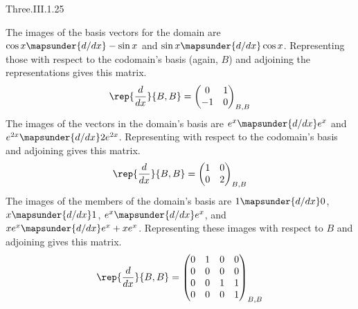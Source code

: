 \begin{ans}{Three.III.1.25}
      \begin{exparts}
        \partsitem The images of the basis vectors for the domain are
         \( \cos x\mapsunder{d/dx}-\sin x \) and
          \( \sin x\mapsunder{d/dx}\cos x \).
          Representing those with respect to the codomain's basis (again, $B$)
          and adjoining the representations gives this matrix.
          \begin{equation*}
            \rep{\frac{d}{dx}}{B,B}=
            \begin{pmatrix}
                0  &1  \\
               -1  &0
            \end{pmatrix}_{B,B}
          \end{equation*}
        \partsitem The images of the vectors in the domain's basis are
          \( e^x\mapsunder{d/dx}e^x \) and
          \( e^{2x}\mapsunder{d/dx}2e^{2x} \).
          Representing with respect to the codomain's basis and adjoining
          gives this matrix.
          \begin{equation*}
            \rep{\frac{d}{dx}}{B,B}=
            \begin{pmatrix}
                1  &0  \\
                0  &2
            \end{pmatrix}_{B,B}
          \end{equation*}
        \partsitem The images of the members of the domain's basis are
          \( 1\mapsunder{d/dx}0 \),
          \( x\mapsunder{d/dx}1 \),
          \( e^{x}\mapsunder{d/dx}e^{x} \), and
          \( xe^{x}\mapsunder{d/dx}e^x+xe^x \).
          Representing these images with respect to $B$ and adjoining
          gives this matrix.
          \begin{equation*}
            \rep{\frac{d}{dx}}{B,B}=
            \begin{pmatrix}
                0  &1  &0  &0 \\
                0  &0  &0  &0 \\
                0  &0  &1  &1 \\
                0  &0  &0  &1
            \end{pmatrix}_{B,B}
          \end{equation*}
      \end{exparts}
    
\end{ans}

